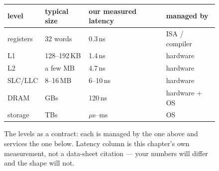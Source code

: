 \begin{figure}[htbp]
\centering
\begin{tabular}{llll}
\toprule
level & typical size & our measured latency & managed by \\
\midrule
registers & 32 words     & 0.3\,ns  & ISA / compiler \\
L1        & 128--192\,KB & 1.4\,ns  & hardware \\
L2        & a few MB     & 4.7\,ns  & hardware \\
SLC/LLC   & 8--16\,MB    & 6--10\,ns & hardware \\
DRAM      & GBs          & 120\,ns  & hardware + OS \\
storage   & TBs          & $\mu$s--ms & OS \\
\bottomrule
\end{tabular}
\caption{The levels as a contract: each is managed by the one above
and services the one below. Latency column is this chapter's own
measurement, not a data-sheet citation --- your numbers will differ
and the shape will not.}
\label{fig:contract09}
\end{figure}
